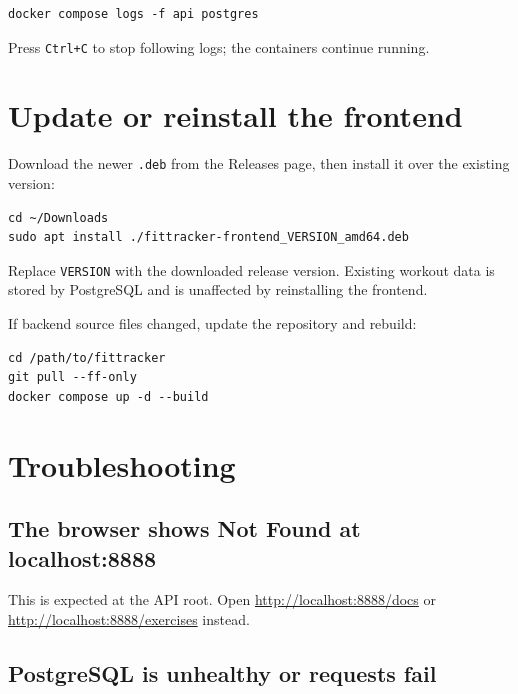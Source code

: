 \documentclass[11pt,a4paper]{article}
\begin{document}
\begin{lstlisting}[caption={Following backend logs}]
docker compose logs -f api postgres
\end{lstlisting}

Press \texttt{Ctrl+C} to stop following logs; the containers continue running.

\section{Update or reinstall the frontend}

Download the newer \texttt{.deb} from the Releases page, then install it over
the existing version:

\begin{lstlisting}[caption={Installing a newer frontend release}]
cd ~/Downloads
sudo apt install ./fittracker-frontend_VERSION_amd64.deb
\end{lstlisting}

Replace \texttt{VERSION} with the downloaded release version. Existing workout
data is stored by PostgreSQL and is unaffected by reinstalling the frontend.

If backend source files changed, update the repository and rebuild:

\begin{lstlisting}[caption={Updating the backend from Git}]
cd /path/to/fittracker
git pull --ff-only
docker compose up -d --build
\end{lstlisting}

\section{Troubleshooting}

\subsection{The browser shows Not Found at localhost:8888}

This is expected at the API root. Open
\url{http://localhost:8888/docs} or
\url{http://localhost:8888/exercises} instead.

\subsection{PostgreSQL is unhealthy or requests fail}
\end{document}
